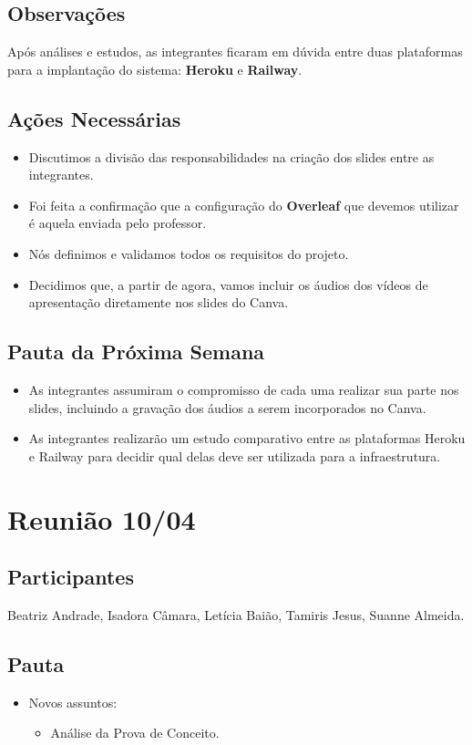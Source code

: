 \begin{apendicesenv}
\subsection*{Observações}
Após análises e estudos, as integrantes ficaram em dúvida entre duas plataformas para a implantação do sistema: \textbf{Heroku} e \textbf{Railway}.

\subsection*{Ações Necessárias}
\begin{itemize}
    \item Discutimos a divisão das responsabilidades na criação dos slides entre as integrantes.
    \item Foi feita a confirmação que a configuração do \textbf{Overleaf} que devemos utilizar é aquela enviada pelo professor.
    \item Nós definimos e validamos todos os requisitos do projeto.
    \item Decidimos que, a partir de agora, vamos incluir os áudios dos vídeos de apresentação diretamente nos slides do Canva.
\end{itemize}

\subsection*{Pauta da Próxima Semana}
\begin{itemize}
    \item As integrantes assumiram o compromisso de cada uma realizar sua parte nos slides, incluindo a gravação dos áudios a serem incorporados no Canva.
    \item As integrantes realizarão um estudo comparativo entre as plataformas Heroku e Railway para decidir qual delas deve ser utilizada para a infraestrutura.
\end{itemize}

\section*{Reunião 10/04}

\subsection*{Participantes}
Beatriz Andrade, Isadora Câmara, Letícia Baião, Tamiris Jesus, Suanne Almeida.

\subsection*{Pauta}
\begin{itemize}
    \item Novos assuntos:
    \begin{itemize}
        \item Análise da Prova de Conceito.
    \end{itemize}
\end{itemize}


\end{apendicesenv}
